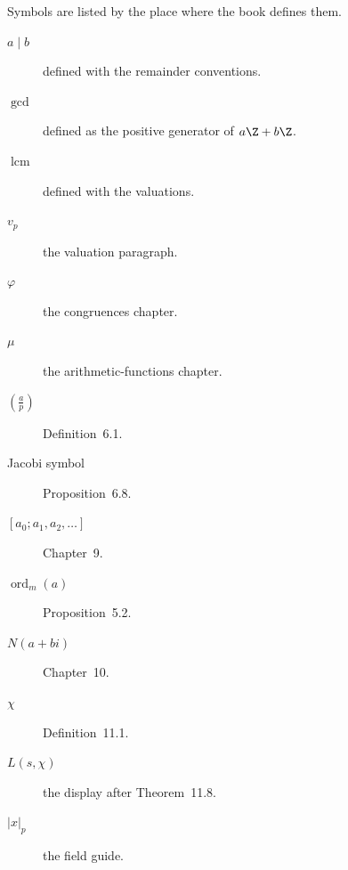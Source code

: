 \noindent Symbols are listed by the place where the book defines them.
\begin{description}
\item[$a\mid b$] defined with the remainder conventions.
\item[$\gcd$] defined as the positive generator of $a\Z+b\Z$.
\item[$\operatorname{lcm}$] defined with the valuations.
\item[$v_p$] the valuation paragraph.
\item[$\varphi$] the congruences chapter.
\item[$\mu$] the arithmetic-functions chapter.
\item[$\left(\frac{a}{p}\right)$] Definition~6.1.
\item[Jacobi symbol] Proposition~6.8.
\item[{$[a_0;a_1,a_2,\ldots]$}] Chapter~9.
\item[$\operatorname{ord}_m(a)$] Proposition~5.2.
\item[$N(a+bi)$] Chapter~10.
\item[$\chi$] Definition~11.1.
\item[$L(s,\chi)$] the display after Theorem~11.8.
\item[$|x|_p$] the field guide.
\end{description}
